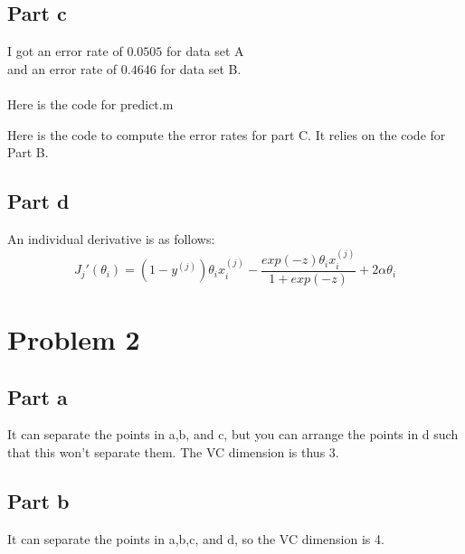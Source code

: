 \documentclass[twoside,11pt]{article}
\theoremstyle{definition}
\begin{document}
\subsection*{Part c}

I got an error rate of $0.0505$ for data set A\\
 and an error rate of $0.4646$ for data set B.\\
\\
Here is the code for predict.m

\newpage
Here is the code to compute the error rates for part C. It relies on the code for Part B.


\subsection*{Part d}

An individual derivative is as follows:
\[
J_j'(\theta_i) = (1-y^{(j)})\theta_i x_i^{(j)} - \frac{exp(-z)\theta_i x_i^{(j)}}{1+exp(-z)} + 2 \alpha \theta_i
\]

\section*{Problem 2}

\subsection*{Part a}

It can separate the points in a,b, and c, but you can arrange the points in d such that this won't separate them. The VC dimension is thus 3.

\subsection*{Part b}

It can separate the points in a,b,c, and d, so the VC dimension is 4.
\end{document}
